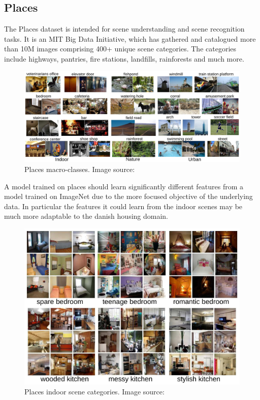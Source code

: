 \subsection{Places}\label{sec:places}
The Places\autocite{Places365} dataset is intended for scene understanding and scene recognition tasks. 
It is an MIT Big Data Initiative, which has gathered and catalogued more than 10M images comprising 400+ unique scene categories.
The categories include highways, pantries, fire stations, landfills, rainforests and much more.
\begin{figure}[H]
    \centering
    \includegraphics[scale=0.28]{pictures/random/placesart_1}
    \caption{Places macro-classes. Image source: \autocite{Places365}}
    \label{fig:placesdata1}
\end{figure}

A model trained on places should learn significantly different features from a model trained on ImageNet due to the more focused objective of the underlying data.
In particular the features it could learn from the indoor scenes may be much more adaptable to the danish housing domain.
\begin{figure}[H]
    \centering
    \includegraphics[scale=0.4]{pictures/random/placesart_2}
    \caption{Places indoor scene categories. Image source: \autocite{Places365}}
    \label{fig:placesdata2}
\end{figure}
